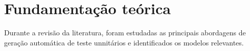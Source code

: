 \section{Fundamentação teórica}
Durante a revisão da literatura, foram estudadas as principais abordagens de geração automática de teste unnitários e identificados os modelos relevantes.


